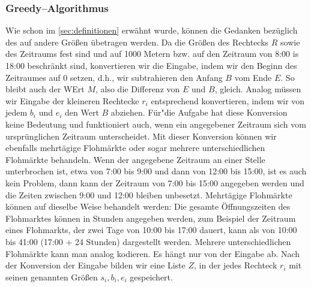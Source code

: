 \subsubsection{Greedy--Algorithmus}
Wie schon im \cref{sec:definitionen} erwähnt wurde, können die Gedanken bezüglich des
\fp{} auf andere Größen übetragen werden. Da die Größen des Rechtecks $R$ sowie des Zeitraums fest sind
und auf 1000 Metern bzw. auf den Zeitraum von 8:00 is 18:00 beschränkt sind, konvertieren wir
die Eingabe, indem wir den Beginn des Zeitraumes auf 0 setzen, d.h., wir subtrahieren den 
Anfang $B$ vom Ende $E$. So bleibt auch der WErt $M$, also die Differenz von $E$ und $B$, gleich. 
Analog müssen wir Eingabe der kleineren Rechtecke $r_i$ entsprechend konvertieren, indem wir
von jedem $b_i$ und $e_i$ den Wert $B$ abziehen. Für"die Aufgabe hat diese Konversion keine
Bedeutung und funktioniert auch, wenn ein angegebener Zeitraum sich vom ursprünglichen Zeitraum unterscheidet.
Mit dieser Konversion können wir ebenfalls mehrtägige Flohmärkte oder
sogar mehrere unterschiedlichen Flohmärkte behandeln.
Wenn der angegebene Zeitraum an einer Stelle unterbrochen ist,
etwa von 7:00 bis 9:00 und dann von 12:00 bis 15:00, ist es auch kein Problem, dann kann der
Zeitraum von 7:00 bis 15:00 angegeben werden und die Zeiten zwischen 9:00 und 12:00 bleiben unbesetzt.
Mehrtägige Flohmärkte können auf dieselbe Weise behandelt werden: Die gesamte Öffnungszeiten des Flohmarktes können in Stunden angegeben werden, zum Beispiel der Zeitraum eines Flohmarkts, der zwei Tage von 10:00 bis 17:00 dauert, kann als von 10:00 bis 41:00 (17:00 + 24 Stunden) dargestellt werden. Mehrere unterschiedlichen Flohmärkte kann man analog kodieren. Es hängt nur von der Eingabe ab.
Nach der Konversion der Eingabe bilden wir eine Liste $Z$, in der jedes
Rechteck $r_i$ mit seinen genannten Größen $s_i, b_i, e_i$ gespeichert.

